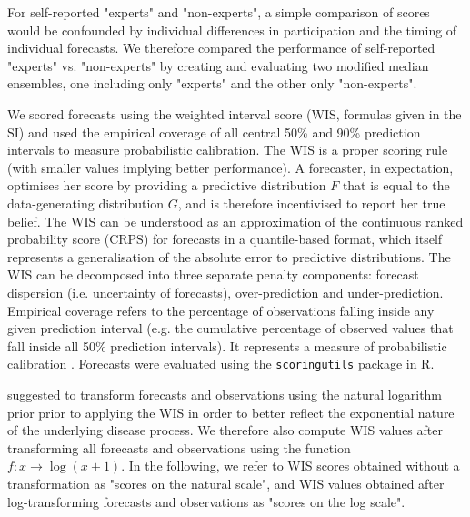 \documentclass[10pt,a4paper,twocolumn]{article}
\begin{document}
For self-reported "experts" and "non-experts", a simple comparison of scores would be confounded by individual differences in participation and the timing of individual forecasts. We therefore compared the performance of self-reported "experts" vs. "non-experts" by creating and evaluating two modified median ensembles, one including only "experts" and the other only "non-experts".


We scored forecasts using the weighted interval score (WIS, formulas given in the SI) %
\cite{bracherEvaluatingEpidemicForecasts2021} and used the empirical coverage of all central 50\% and 90\% prediction intervals to measure probabilistic calibration. The WIS is a proper scoring rule (with smaller values implying better performance). A forecaster, in expectation, optimises her score by providing a predictive distribution $F$ that is equal to the data-generating distribution $G$, and is therefore incentivised to report her true belief. The WIS can be understood as an approximation of the continuous ranked probability score (CRPS) for forecasts in a quantile-based format, which itself represents a generalisation of the absolute error to predictive distributions. The WIS can be decomposed into three separate penalty components: forecast dispersion (i.e. uncertainty of forecasts), over-prediction and under-prediction. Empirical coverage refers to the percentage of observations falling inside any given prediction interval (e.g. the cumulative percentage of observed values that fall inside all 50\% prediction intervals). It represents a measure of probabilistic calibration \citep{gneitingProbabilisticForecastsCalibration2007}. Forecasts were evaluated using the \texttt{scoringutils} \citep{bosseEvaluatingForecastsScoringutils2022} package in \textsf{R}.

\citet{bosseTransformationForecastsEvaluating2023} suggested to transform forecasts and observations using the natural logarithm prior prior to applying the WIS in order to better reflect the exponential nature of the underlying disease process. We therefore also compute WIS values after transforming all forecasts and observations using the function $f\colon x \to \log (x + 1)$. In the following, we refer to WIS scores obtained without a transformation as "scores on the natural scale", and WIS values obtained after log-transforming forecasts and observations as "scores on the log scale". 
\end{document}
